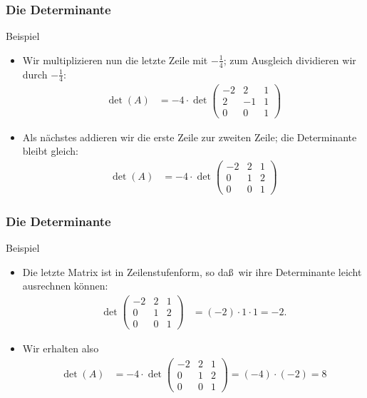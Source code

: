 \documentclass{beamer}
\renewcommand{\ae}{\"a}
\renewcommand{\oe}{\"o}
\newcommand{\mytitle}{Die Determinante}
\begin{document}
\begin{frame}\frametitle{\mytitle}
	\begin{block}{Beispiel}
		\begin{itemize}
			\item Wir multiplizieren nun die letzte Zeile mit $-\frac{1}{4}$; zum Ausgleich dividieren wir durch $-\frac{1}{4}$:
				\begin{align*}
					\det(A)&=-4\cdot\det\begin{pmatrix} -2&2&1\\2&-1&1\\0&0&1 \end{pmatrix}
				\end{align*}
			\item Als n\ae chstes addieren wir die erste Zeile zur zweiten Zeile; die Determinante bleibt gleich:
\begin{align*}
					\det(A)&=-4\cdot\det\begin{pmatrix} -2&2&1\\0&1&2\\0&0&1 \end{pmatrix}
				\end{align*}
		\end{itemize}
	\end{block}
\end{frame}

\begin{frame}\frametitle{\mytitle}
	\begin{block}{Beispiel}
		\begin{itemize}
			\item Die letzte Matrix ist in Zeilenstufenform, so da\ss\ wir ihre Determinante leicht ausrechnen k\oe nnen:
\begin{align*}
	\det\begin{pmatrix} -2&2&1\\0&1&2\\0&0&1 \end{pmatrix}&=(-2)\cdot1\cdot 1=-2.
				\end{align*}
			\item Wir erhalten also
\begin{align*}
	\det(A)&=-4\cdot\det\begin{pmatrix} -2&2&1\\0&1&2\\0&0&1 \end{pmatrix}=(-4)\cdot(-2)=8
				\end{align*}
		\end{itemize}
	\end{block}
\end{frame}
\end{document}
